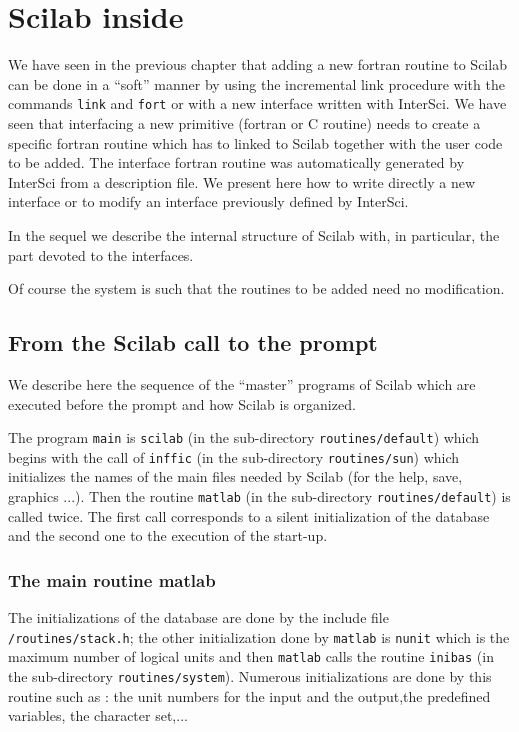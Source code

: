 \chapter{Scilab inside}

We have seen in the previous chapter that adding a new fortran routine to 
Scilab can be 
done in a ``soft'' manner by using the incremental link procedure with the
commands {\tt link} and {\tt fort} or with a new interface written with
InterSci. We have seen that interfacing a new primitive (fortran or C routine)
 needs to create
a specific fortran routine which has to linked to Scilab together with
the user code to be added. The interface fortran routine was automatically
generated by InterSci from a description file.  We present here how to write 
directly a new 
interface or to modify an interface previously defined by InterSci.

In the sequel we describe the internal structure of Scilab with, in particular,
the part devoted to the interfaces.

Of course the system is such that the routines to be added need no
modification.

\section{From the Scilab call to the prompt}
We describe here the sequence of the ``master'' programs of Scilab which are
executed before the prompt and how Scilab is organized.

The program {\tt main} is {\tt scilab} (in the sub-directory 
{\tt routines/default}) which  begins with the call of {\tt inffic} 
(in the sub-directory {\tt routines/sun}) which initializes the names of the 
main files
needed by Scilab (for the help, save, graphics ...). Then the routine 
{\tt matlab} (in the sub-directory {\tt routines/default}) is called 
twice. The first call corresponds to a silent initialization of the database
and the second one to the execution of the start-up.

\subsection{The main routine matlab}
The initializations of the database are done by the include file 
{\tt <scilab dir>/routines/stack.h}; the other initialization done by 
{\tt matlab} is {\tt nunit} which is the maximum number of logical units and 
then {\tt matlab} calls the routine {\tt inibas} (in the sub-directory
{\tt routines/system}). Numerous initializations are done by this routine
such as : the unit numbers for the input and the output,the predefined 
variables, the character set,...

